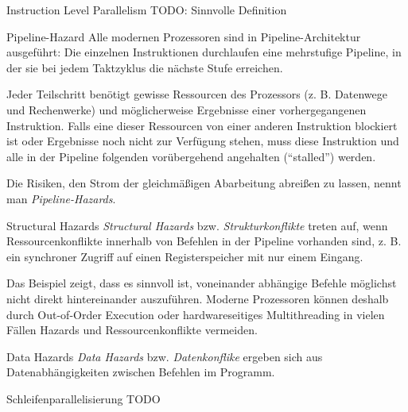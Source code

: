 \begin{defi}{Instruction Level Parallelism}
    TODO: Sinnvolle Definition
\end{defi}

\begin{defi}{Pipeline-Hazard}
    Alle modernen Prozessoren sind in Pipeline-Architektur ausgeführt:
    Die einzelnen Instruktionen durchlaufen eine mehrstufige Pipeline, in der sie bei jedem Taktzyklus die nächste Stufe erreichen.

    Jeder Teilschritt benötigt gewisse Ressourcen des Prozessors (z. B. Datenwege und Rechenwerke) und möglicherweise Ergebnisse einer vorhergegangenen Instruktion.
    Falls eine dieser Ressourcen von einer anderen Instruktion blockiert ist oder Ergebnisse noch nicht zur Verfügung stehen, muss diese Instruktion und alle in der Pipeline folgenden vorübergehend angehalten (\enquote{stalled}) werden.

    Die Risiken, den Strom der gleichmäßigen Abarbeitung abreißen zu lassen, nennt man \emph{Pipeline-Hazards}.
\end{defi}

\begin{defi}{Structural Hazards}
    \emph{Structural Hazards} bzw. \emph{Strukturkonflikte} treten auf, wenn Ressourcenkonflikte innerhalb von Befehlen in der Pipeline vorhanden sind, z. B. ein synchroner Zugriff auf einen Registerspeicher mit nur einem Eingang.

    Das Beispiel zeigt, dass es sinnvoll ist, voneinander abhängige Befehle möglichst nicht direkt hintereinander auszuführen.
    Moderne Prozessoren können deshalb durch Out-of-Order Execution oder hardwareseitiges Multithreading in vielen Fällen Hazards und Ressourcenkonflikte vermeiden.
\end{defi}

\begin{defi}{Data Hazards}
    \emph{Data Hazards} bzw. \emph{Datenkonflike} ergeben sich aus Datenabhängigkeiten zwischen Befehlen im Programm.
\end{defi}

\begin{defi}{Schleifenparallelisierung}
    TODO
\end{defi}

